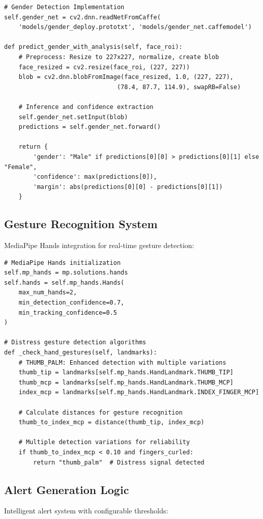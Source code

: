 \documentclass[12pt,a4paper]{article}
\begin{document}
\begin{lstlisting}
# Gender Detection Implementation
self.gender_net = cv2.dnn.readNetFromCaffe(
    'models/gender_deploy.prototxt', 'models/gender_net.caffemodel')

def predict_gender_with_analysis(self, face_roi):
    # Preprocess: Resize to 227x227, normalize, create blob
    face_resized = cv2.resize(face_roi, (227, 227))
    blob = cv2.dnn.blobFromImage(face_resized, 1.0, (227, 227),
                               (78.4, 87.7, 114.9), swapRB=False)
    
    # Inference and confidence extraction
    self.gender_net.setInput(blob)
    predictions = self.gender_net.forward()
    
    return {
        'gender': "Male" if predictions[0][0] > predictions[0][1] else "Female",
        'confidence': max(predictions[0]),
        'margin': abs(predictions[0][0] - predictions[0][1])
    }
\end{lstlisting}

\subsection{Gesture Recognition System}
MediaPipe Hands integration for real-time gesture detection:

\begin{lstlisting}
# MediaPipe Hands initialization
self.mp_hands = mp.solutions.hands
self.hands = self.mp_hands.Hands(
    max_num_hands=2,
    min_detection_confidence=0.7,
    min_tracking_confidence=0.5
)

# Distress gesture detection algorithms
def _check_hand_gestures(self, landmarks):
    # THUMB_PALM: Enhanced detection with multiple variations
    thumb_tip = landmarks[self.mp_hands.HandLandmark.THUMB_TIP]
    thumb_mcp = landmarks[self.mp_hands.HandLandmark.THUMB_MCP]
    index_mcp = landmarks[self.mp_hands.HandLandmark.INDEX_FINGER_MCP]
    
    # Calculate distances for gesture recognition
    thumb_to_index_mcp = distance(thumb_tip, index_mcp)
    
    # Multiple detection variations for reliability
    if thumb_to_index_mcp < 0.10 and fingers_curled:
        return "thumb_palm"  # Distress signal detected
\end{lstlisting}

\subsection{Alert Generation Logic}
Intelligent alert system with configurable thresholds:
\end{document}
